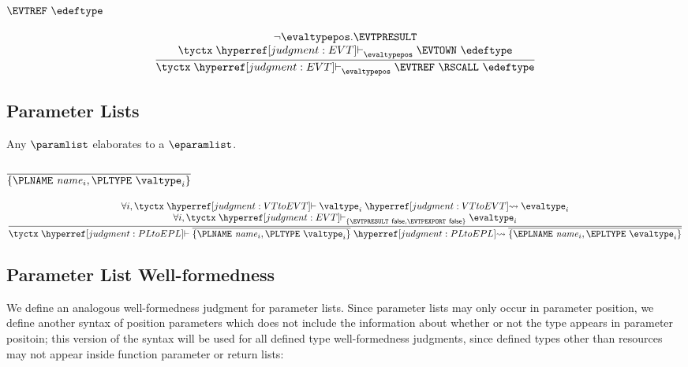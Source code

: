 \subsubsection{$\EVTREF~\edeftype$}
\[
  \frac{
    \begin{array}{@{}c@{}}
    \neg \evaltypepos.\EVTPRESULT\\
    \tyctx \vdashh!EVT!_\evaltypepos \EVTOWN~\edeftype
    \end{array}
  }{
    \tyctx \vdashh!EVT!_\evaltypepos \EVTREF~\RSCALL~\edeftype
  }
\]

\subsection{Parameter Lists}
\label{judgment:PLtoEPL}

Any $\paramlist$ elaborates to a $\eparamlist$.

\subsubsection{$\overline{\{\PLNAME~\name_i, \PLTYPE~\valtype_i\}}$}
\[
  \frac{
    \begin{array}{@{}c@{}}
    \forall i, \tyctx \vdashh!VTtoEVT! \valtype_i \leadstoh!VTtoEVT! {\evaltype}_i\\
    \forall i, \tyctx \vdashh!EVT!_{\{\EVTPRESULT~\false,\EVTPEXPORT~\false\}} {\evaltype}_i\\
    \end{array}
  }{
    \tyctx \vdashh!PLtoEPL! \overline{\{\PLNAME~\name_i,
    \PLTYPE~\valtype_i\}} \leadstoh!PLtoEPL! \overline{\{\EPLNAME~\name_i,
    \EPLTYPE~{\evaltype}_i\}}
  }
\]

\subsection{Parameter List Well-formedness}
\label{judgment:EPL}

We define an analogous well-formedness judgment for parameter lists.
Since parameter lists may only occur in parameter position, we define
another syntax of position parameters which does not include the
information about whether or not the type appears in parameter
positoin; this version of the syntax will be used for all defined type
well-formedness judgments, since defined types other than resources
may not appear inside function parameter or return lists:

